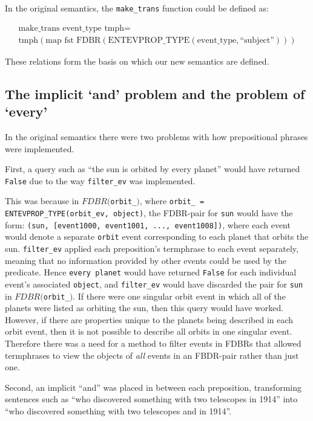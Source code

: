 \documentclass[../main.tex]{subfiles}
\begin{document}
In the original semantics, the \texttt{make\_trans} function could be defined as:

\begin{multline}
  \text{make\_trans event\_type tmph} = \\ \text{tmph} (\text{map fst
  FDBR}(\text{ENTEVPROP\_TYPE}(\text{event\_type}, \text{``subject''})))
\end{multline}

These relations form the basis on which our new semantics are defined.

\subsection{The implicit `and' problem and the problem of `every'}

In the original semantics there were two problems with how prepositional phrases were implemented.

First, a query such as ``the sun is orbited by every planet'' would have returned \texttt{False} due to the way \texttt{filter\_ev} was implemented.

This was because in $FDBR($\texttt{orbit\_}$)$, where \texttt{orbit\_ = ENTEVPROP\_TYPE(orbit\_ev, object)}, the FDBR-pair for \texttt{sun} would have the form: \texttt{(sun, [event1000, event1001, ..., event1008])}, where each event would denote a separate \texttt{orbit} event corresponding to each planet that orbits the sun.  \texttt{filter\_ev} applied each preposition's termphrase to each event separately, meaning that no information provided by other events could be used by the predicate.  Hence \texttt{every planet} would have returned \texttt{False} for each individual event's associated \texttt{object}, and \texttt{filter\_ev} would have discarded the pair for \texttt{sun} in $FDBR($\texttt{orbit\_}$)$.  If there were one singular orbit event in which all of the planets were listed as orbiting the sun, then this query would have worked.  However, if there are properties unique to the planets being described in each orbit event, then it is not possible to describe all orbits in one singular event.  Therefore there was a need for a method to filter events in FDBRs that allowed termphrases to view the objects of {\em all} events in an FBDR-pair rather than just one.  

Second, an implicit ``and'' was placed in between each preposition, transforming sentences such as ``who discovered something with two telescopes in 1914'' into ``who discovered something with two telescopes and in 1914''.
\end{document}
